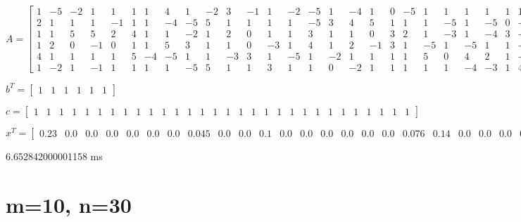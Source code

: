 \documentclass[8pt]{article}
\begin{document}
\small
$ A =
\begin{bmatrix}
  1  & -5  & -2  &  1  &  1  &  1  &  1  &  4  &  1  & -2  &  3  & -1  &  1  & -2  & -5  &  1  & -4  &  1  &  0  & -5  &  1  &  1  &  1  &  1  &  1  &  1  & -1  &  2  & -3  &  1 \\
  2  &  1  &  1  &  1  & -1  &  1  &  1  & -4  & -5  &  5  &  1  &  1  &  1  &  1  & -5  &  3  &  4  &  5  &  1  &  1  &  1  & -5  &  1  & -5  &  0  & -5  & -5  &  1  & -5  &  1 \\
  1  &  1  &  5  &  5  &  2  &  4  &  1  &  1  & -2  &  1  &  2  &  0  &  1  &  1  &  3  &  1  &  1  &  0  &  3  &  2  &  1  & -3  &  1  & -4  &  3  & -3  & -4  &  1  &  2  & -3 \\
  1  &  2  &  0  & -1  &  0  &  1  &  1  &  5  &  3  &  1  &  1  &  0  & -3  &  1  &  4  &  1  &  2  & -1  &  3  &  1  & -5  &  1  & -5  &  1  &  1  & -1  &  5  &  1  &  1  &  1 \\
  4  &  1  &  1  &  1  &  1  &  5  & -4  & -5  &  1  &  1  & -3  &  3  &  1  & -5  &  1  & -2  &  1  &  1  &  1  &  1  &  5  &  0  &  4  &  2  &  1  & -2  &  3  &  4  &  1  &  1 \\
  1  & -2  &  1  & -1  &  1  &  1  &  1  &  1  & -5  &  5  &  1  &  1  &  3  &  1  &  1  &  0  & -2  &  1  &  1  &  1  &  1  &  1  & -4  & -3  &  1  &  4  &  1  &  4  & -5  & -2 
\end{bmatrix}
$


\small
$ b^T =
\begin{bmatrix}
  1  &  1  &  1  &  1  &  1  &  1 
\end{bmatrix}
$


\small
$ c =
\begin{bmatrix}
  1  &  1  &  1  &  1  &  1  &  1  &  1  &  1  &  1  &  1  &  1  &  1  &  1  &  1  &  1  &  1  &  1  &  1  &  1  &  1  &  1  &  1  &  1  &  1  &  1  &  1  &  1  &  1  &  1  &  1 
\end{bmatrix}
$


\small
$ x^T =
\begin{bmatrix}
  0.23 &  0.0 &  0.0 &  0.0 &  0.0 &  0.0 &  0.0 &  0.045 &  0.0 &  0.0 &  0.1 &  0.0 &  0.0 &  0.0 &  0.0 &  0.0 &  0.0 &  0.076 &  0.14 &  0.0 &  0.0 &  0.0 &  0.0 &  0.0 &  0.0 &  0.0 &  0.0 &  0.1 &  0.0 &  0.0
\end{bmatrix}
$


6.652842000001158  ms


\section{ m=10, n=30 }
\end{document}
